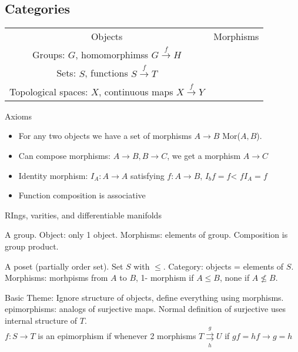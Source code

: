 
\subsection{Categories}

\begin{example}
    \begin{tabular}{c c}
        Objects & Morphisms \\
        Groups: $G$, homomorphimss $G \stackrel{f}{\to} H$ \\
        Sets: $S$, functions $S \stackrel{f}{\to} T$ \\
        Topological spaces: $X$, continuous maps $X \stackrel{f}{\to} Y$ 
    \end{tabular}
\end{example}

\noindent
Axioms 
\begin{itemize}
    \item For any two objects we have a set of morphisms $A \to B$ Mor($A,B$). 
    \item Can compose morphisms: $A \to B, B \to C$, we get a morphism $A \to C$ \\
    \item Identity morphism: $I_A: A \to A$ satisfying $f: A \to B$, $I_bf = f$< $fI_A = f$ 
    \item Function composition is associative
\end{itemize}

\begin{example}
    RIngs, varities, and differentiable manifolds
\end{example}

\begin{example}
    A group. Object: only 1 object. Morphisms: elements of group. Composition is group product. 
\end{example}

\begin{example}
    A poset (partially order set). Set $S$ with $\le$. Category: objects = elements of $S$. Morphisms: morhpisms from $A$ to $B$, 1- morphism if $A \le B$, none if $A \not\le B$. 
\end{example}

\noindent
Basic Theme: Ignore structure of objects, define everything using morphisms. \\
epimorphisms: analogs of surjective maps. Normal definition of surjective uses internal structure of $T$. \\
$f: S \to T$ is an epimorphism if whenever 2 morphisms $T \overset{g}{\underset{h}{\rightrightarrows}} U$ if $gf = hf \to g = h$ 

